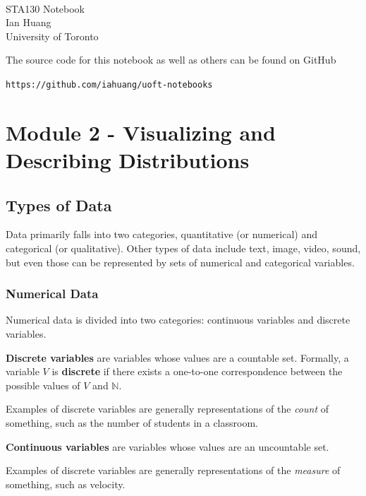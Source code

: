 \documentclass[10pt]{article}
\def\N{{\mathbb N}}
\newenvironment{definition}[1][]{\begin{tcolorbox}[colframe=_orange,colback=_orange2,title=Definition. \ifthenelse{\isempty{#1}}{}{(#1)}
]}{\end{tcolorbox}}
\begin{document}
\thispagestyle{empty}
$~$
\vspace{1in}
\begin{center}
    {\Huge STA130 Notebook} \\
    \vspace{0.3in}
    {\Large Ian Huang} \\
    University of Toronto
\end{center}
\vfill

The source code for this notebook as well as others can be found on GitHub
\begin{center}
    \texttt{https://github.com/iahuang/uoft-notebooks}
\end{center}

\tableofcontents
\thispagestyle{empty}
\newpage

\section{Module 2 - Visualizing and Describing Distributions}

\subsection{Types of Data}
Data primarily falls into two categories, quantitative (or numerical) and categorical (or qualitative). Other types of data include text, image, video, sound, but even those can be represented by sets of numerical and categorical variables.
\subsubsection{Numerical Data}
Numerical data is divided into two categories: continuous variables and discrete variables.
\begin{definition}[Discrete Variable]
    \textbf{Discrete variables} are variables whose values are a countable set. Formally, a variable $V$ is \textbf{discrete} if there exists a one-to-one correspondence between the possible values of $V$ and $\N$.
\end{definition}
Examples of discrete variables are generally representations of the \textit{count} of something, such as the number of students in a classroom.
\begin{definition}[Continuous Variables]
    \textbf{Continuous variables} are variables whose values are an uncountable set.
\end{definition}
Examples of discrete variables are generally representations of the \textit{measure} of something, such as velocity.
\end{document}
